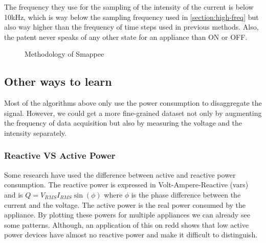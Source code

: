 The frequency they use for the sampling of the intensity of the current is below 10kHz, which is way below the sampling frequency used in \autoref{section:high-freq} but also way higher than the frequency of time steps used in previous methods. Also, the patent never speaks of any other state for an appliance than ON or OFF.
\begin{figure}
    \centering
    \caption{Methodology of Smappee}
    \label{fig:smappe}
\end{figure}


\subsection{Other ways to learn}
Most of the algorithms above only use the power consumption to disaggregate the signal. However, we could get a more fine-grained dataset not only by augmenting the frequency of data acquisition but also by measuring the voltage and the intensity separately.


\subsubsection{Reactive VS Active Power}
Some research \cite{hassan2014empirical} have used the difference between active and reactive power consumption. The reactive power is expressed in Volt-Ampere-Reactive (vars) and is $Q=V_{RMS}I_{RMS}\sin(\phi)$ where $\phi$ is the phase difference between the current and the voltage. The active power is the real power consumed by the appliance. By plotting these powers for multiple appliances we can already see some patterns. Although, an application of this on \acrshort{redd} shows that low active power devices have almost no reactive power and make it difficult to distinguish.

